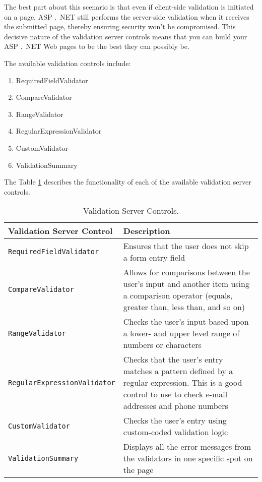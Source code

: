 The best part about this scenario is that even if client-side validation is initiated on a page, ASP .\ NET still
performs the server-side validation when it receives the submitted page, thereby ensuring security won’t
be compromised. This decisive nature of the validation server controls means that you can build your
ASP .\ NET Web pages to be the best they can possibly be.

The available validation controls include:

\begin{multicols}{2}
	\begin{enumerate}
		\item RequiredFieldValidator
		\item CompareValidator
		\item RangeValidator
		\item RegularExpressionValidator
		\item CustomValidator
		\item ValidationSummary
	\end{enumerate}
\end{multicols}


The Table \ref{tab:validation-server-control} describes the functionality of each of the available validation server controls.


\begin{table}[ht!]
	\centering
	\caption{Validation Server Controls.}\label{tab:validation-server-control}
\begin{tabular}{p{5cm}p{7cm}}
	\toprule
	\textbf{Validation Server Control} & \textbf{Description} \\
	\midrule
	
	\texttt{RequiredFieldValidator} 		& Ensures that the user does not skip a form entry field\\
	
	\texttt{CompareValidator}			& Allows for comparisons between the user’s input and another item using a comparison operator (equals, greater than, less than, and so on)\\
	
	\texttt{RangeValidator}				& Checks the user’s input based upon a lower- and upper level range of numbers or characters\\
	
	\texttt{RegularExpressionValidator} 	& Checks that the user’s entry matches a pattern defined by a regular expression. This is a good control to use to check e-mail addresses and phone numbers \\
	
	\texttt{CustomValidator} 			& Checks the user's entry using custom-coded validation logic\\
	\texttt{ValidationSummary}			& Displays all the error messages from the validators in one specific spot on the page\\
	\bottomrule	
\end{tabular}
\end{table}


